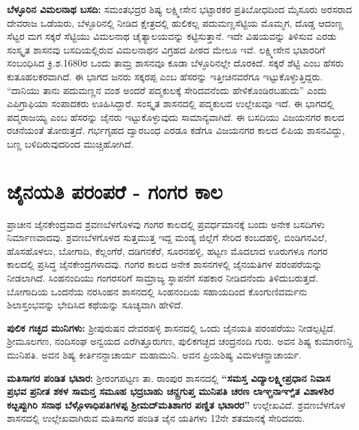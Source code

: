 \textbf{ಬೆಳ್ಳೂರಿನ ವಿಮಲನಾಥ ಬಸದಿ:} ಸಮಂತಭದ್ರರ ಶಿಷ್ಯ ಲಕ್ಷ್ಮೀಸೇನ ಭಟ್ಟಾರಕರ ಪ್ರತಿಬೋಧದಿಂದ ಮೈಸೂರು ಅರಸರಾದ ದೇವರಾಜ ಒಡೆಯರು, ಬೆಳ್ಳೂರಿನಲ್ಲಿ ನೀಡಿದ ಕ್ಷೇತ್ರದಲ್ಲಿ ಹುಲಿಕಲ್ಲ ಪದುಮಣ್ಣಸೆಟ್ಟಿಯ ಮೊಮ್ಮಗ, ದೊಡ್ಡ ಆದಂಣ್ಣ ಸೆಟ್ಟರ ಮಗ ಸಕ್ಕರೆ ಸೆಟ್ಟಿಯು ವಿಮಲನಾಥ ಚೈತ್ಯಾಲಯವನ್ನು ಕಟ್ಟಿಸುತ್ತಾನೆ. ಇದೇ ವಿಷಯವನ್ನು ತಿಳಿಸುವ ಎರಡು ಸಂಸ್ಕೃತ ಶಾಸನವು ಬಸದಿಯಲ್ಲಿರುವ ವಿಮಲನಾಥನ ವಿಗ್ರಹದ ಪೀಠದ ಮೇಲೂ ಇವೆ. ಲಕ್ಷ್ಮೀಸೇನ ಭಟಾರರಿಗೆ ಸಂಬಂಧಿಸಿದ ಕ್ರಿ.ಶ.1680ರ ಒಂದು ತಾಮ್ರ ಶಾಸನವೂ ಕೂಡಾ ಬೆಳ್ಳೂರಿನಲ್ಲೇ ದೊರಕಿದೆ. ಸಕ್ಕರೆ ಶೆಟ್ಟಿ ಎಂಬ ಹೆಸರು ಕುತೂಹಲಕರವಾಗಿದೆ. ಈ ಭಾಗದ ಜನರು ಸಕ್ಕರಪ್ಪ ಎಂಬ ಹೆಸರನ್ನು ಇತ್ತೀಚಿನವರೆಗೂ ಇಟ್ಟುಕೊಳ್ಳುತ್ತಿದ್ದರು. “ದಾನಿಯು ತಾನು ಪದುಮಣ್ಣನ ವಂಶ ಅಂದರೆ ಪದ್ಮಕುಲಕ್ಕೆ ಸೇರಿದವನೆಂದು ಹೇಳಿಕೊಂಡಿರಬಹುದು” ಎಂದು ಎಪಿಗ್ರಾಫಿಯಾ ಸಂಪಾದಕರು ಊಹಿಸಿದ್ದಾರೆ. ಸಂಸ್ಕೃತ ಶಾಸನದಲ್ಲಿ ಪದ್ಮಕುಲದ ಉಲ್ಲೇಖವೂ ಇದೆ. ಈ ಭಾಗದಲ್ಲಿ ಪದ್ಮರಾಜಯ್ಯ ಎಂಬ ಹೆಸರನ್ನು ಜೈನರು ಇಟ್ಟುಕೊಳ್ಳುವುದು ಸಾಮಾನ್ಯವಾಗಿದೆ. ಈ ಬಸದಿಯು ವಿಜಯನಗರ ಕಾಲದ ರಚನೆಯಂತೆ ತೋರುತ್ತದೆ. ಗರ್ಭಗೃಹದ ದ್ವಾರಬಂಧ ಎರಡೂ ಕಡೆಗೂ ವಿಜಯನಗರ ಕಾಲದ ಲಿಪಿಯ ಶಾಸನವಿದ್ದು, ಬಣ್ಣ ಬಳಿದಿರುವುದರಿಂದ ಮುಚ್ಚಿಹೋಗಿದೆ.

\section*{ಜೈನಯತಿ ಪರಂಪರೆ - ಗಂಗರ ಕಾಲ}

ಪ್ರಾಚೀನ ಜೈನಕೇಂದ್ರವಾದ ಶ್ರವಣಬೆಳಗೊಳವು ಗಂಗರ ಕಾಲದಲ್ಲಿ ಪ್ರವರ್ಧಮಾನಕ್ಕೆ ಬಂದು ಅನೇಕ ಬಸದಿಗಳು ನಿರ್ಮಾಣ\-ವಾದವು. ಶ್ರವಣಬೆಳಗೊಳದ ಸುತ್ತಮುತ್ತ ಇದ್ದ ಮಂಡ್ಯ ಜಿಲ್ಲೆಗೆ ಸೇರಿದ ಕಂಬದಹಳ್ಳಿ, ಬಿಂಡಿಗನವಿಲೆ, ಹೊಸಹೊಳಲು, ಬೋಗಾದಿ, ಕೆಲ್ಲಂಗೆರೆ, ದಡಿಗನಕೆರೆ, ಸೂರನಹಳ್ಳಿ, ಹಟ್ಟಣ ಮೊದಲಾದ ಊರುಗಳೂ ಗಂಗರ ಕಾಲದಲ್ಲಿ ಪ್ರಸಿದ್ಧ ಜೈನಕೇಂದ್ರ\-ಗಳಾದವು. ಗಂಗರ ಕಾಲದ ಅನೇಕ ಶಾಸನಗಳಲ್ಲಿ ಜೈನಯತಿಗಳ ಪರಂಪರೆಯನ್ನು ನೀಡಲಾಗಿದೆ. ಸಿಂಹನಂದಿಯು ಗಂಗರಸರಿಗೆ ಸಾಮ್ರಾಜ್ಯ ಸ್ಥಾಪನೆಗೆ ಸಹಕಾರ ನೀಡಿದನೆಂದು ತಿಳಿದುಬರುತ್ತದೆ. ಬೋಗಾದಿಯ ಒಂದನೆಯ ನರಸಿಂಹನ ಶಾಸನದಲ್ಲಿ ಸಿಂಹನಂದಿಯ ಸಹಾಯದಿಂದ ಕೊಂಗುಣಿವರ್ಮನು ಶಿಲಾಸ್ತಂಭವನ್ನು ಭೇದಿಸಿದ ಕಥೆಯನ್ನು ಸೂಚ್ಯವಾಗಿ ಹೇಳಿದೆ.

\textbf{ಪುಲಿಕ ಗಚ್ಛದ ಮುನಿಗಳು:} ಶ‍್ರೀಪುರುಷನ ದೇವರಹಳ್ಳಿ ಶಾಸನದಲ್ಲಿ ಒಂದು ಜೈನಯತಿ ಪರಂಪರೆಯು ನೀಡಲ್ಪಟ್ಟಿದೆ. ಶ‍್ರೀಮೂಲಗಣ, ನಂದಿಸಂಘ ಅನ್ವಯದ ಎರೆಗಿತ್ತೂರುಗಣ, ಪುಲಿಕಗಚ್ಛದ ಚಂದ್ರನಂದಿ ಗುರು. ಅವನ ಶಿಷ್ಯ ಕುಮಾರಣನ್ದಿ ಮುನಿಪತಿ. ಅವನ ಶಿಷ್ಯ ಕೀರ್ತಿನನ್ದಾಚಾರ್ಯ ಮಹಾಮುನಿ. ಅವನ ಪ್ರಿಯಶಿಷ್ಯ ವಿಮಳಚನ್ದ್ರಾಚಾರ್ಯ.

\textbf{ಮತಿಸಾಗರ ಪಂಡಿತ ಭಟಾರ:} ಶ‍್ರೀರಂಗಪಟ್ಟಣ ತಾ. ರಾಂಪುರ ಶಾಸನದಲ್ಲಿ \textbf{“ಸಮಸ್ತ ವಿದ್ಯಾಲಕ್ಷ್ಮೀಪ್ರಧಾನ ನಿವಾಸ ಪ್ರಭವ ಪ್ರನೀತ ಶಕಳ ಸಾಮನ್ತ ಸಮೂಹ ಭದ್ರಬಾಹು ಚನ್ದ್ರಗುಪ್ತ ಮುನಿಪತಿ ಚರಣ ಲಾಞ್ಚನಾಞ್ಚಿತ ವಿಶಾಳಶಿರ ಕೞ್ಬಪ್ಪುಗಿರಿ ಸನಾಥ ಬೆಳ್ಗೊಳಾಧಿಪತಿಗಳಪ್ಪ ಶ‍್ರೀಮದ್​ ಮತಿಶಾಗರ ಪಣ್ಡಿತ ಭಟಾರರ”} ಉಲ್ಲೇಖವಿದೆ. ಶ್ರವಣಬೆಳಗೊಳ ಶಾಸನದಲ್ಲಿ ಉಲ್ಲೇಖವಾಗಿರುವ ಮತಿಸಾಗರ ಪಂಡಿತ ಜೈನ ಯತಿಗಳು 12ನೇ ಶತಮಾನಕ್ಕೆ ಸೇರಿದವರು.

